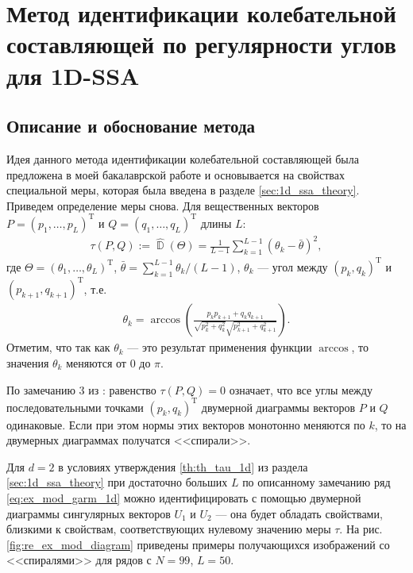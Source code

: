 \documentclass[specialist,
               substylefile = spbu.rtx,
               subf,href,colorlinks=true, 12pt]{disser}
\DeclareMathOperator{\D}{\mathbb{D}}
\begin{document}
\chapter{Метод идентификации колебательной составляющей по регулярности углов для 1D-SSA}
\label{sec:tau1}
\section{Описание и обоснование метода}
Идея данного метода идентификации колебательной составляющей была предложена в моей бакалаврской работе \cite{Zhornikova2016} и основывается на свойствах специальной меры, которая была введена в разделе \ref{sec:1d_ssa_theory}.
Приведем определение меры снова.
Для вещественных векторов $P = (p_1,\ldots,p_L)^{\mathrm{T}}$ и $Q=(q_1,\ldots,q_L)^{\mathrm{T}}$ длины $L$: 
\begin{gather*} 
\tau(P, Q) := \hat{\D}(\Theta) =\frac{1}{L-1}\sum_{k=1}^{L-1}{\left(\theta_k  - \bar{\theta}\right)^2},
\end{gather*}
где $\Theta=(\theta_1,\ldots,\theta_L)^{\mathrm{T}}$,
$\bar{\theta} = \sum_{k=1}^{L-1}{\theta_k}/(L-1)$, $\theta_k$ --- угол между  
$\left(p_k, q_{k}\right)^{\mathrm{T}}$ и $\left(p_{k+1}, q_{k+1}\right)^{\mathrm{T}}$, т.е.
\begin{gather*}
\theta_k = \arccos{\left(\frac{p_{k} p_{k+1} + q_{k} q_{k+1}}{\sqrt{p_{k}^2+q_{k}^2}\sqrt{p_{k+1}^2+q_{k+1}^2}}\right)}.
\end{gather*}
Отметим, что так как $\theta_k$ --- это результат применения функции $\arccos$, то значения $\theta_k$ меняются от $0$ до $\pi$. 

По замечанию 3 из  \cite{Zhornikova2016}:
равенство $\tau(P, Q) =0$ означает, что все углы между последовательными точками $(p_k, q_k)^{\mathrm{T}}$ двумерной диаграммы векторов $P$ и $Q$ одинаковые. Если при этом нормы этих векторов монотонно меняются по $k$, то на двумерных диаграммах получатся <<спирали>>.

Для $d=2$ в условиях утверждения \ref{th:th_tau_1d} из раздела \ref{sec:1d_ssa_theory} при достаточно больших $L$ по описанному замечанию ряд \eqref{eq:ex_mod_garm_1d} можно идентифицировать с помощью двумерной диаграммы сингулярных векторов $U_1$ и $U_2$ --- она будет обладать свойствами, близкими к свойствам, соответствующих нулевому значению меры $\tau$. На рис. \ref{fig:re_ex_mod_diagram} приведены примеры получающихся изображений со <<спиралями>> для рядов с $N=99$, $L=50$. 
\end{document}
